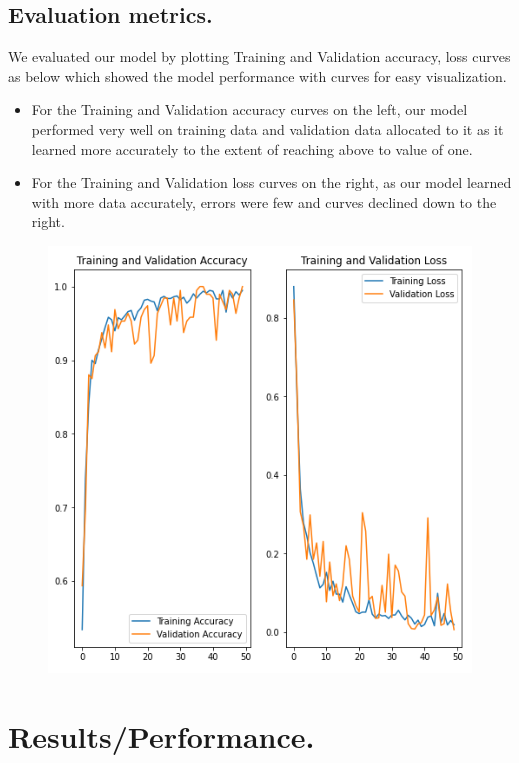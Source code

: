 \documentclass[11pt]{report}
\begin{document}
\subsection{Evaluation metrics.}
We evaluated our model by plotting Training and Validation accuracy, loss curves as below which showed the model performance with curves for easy visualization.\\
\begin{itemize}
	\item For the Training and Validation accuracy curves on the left, our model performed very well on training data and validation data allocated to it as it learned more accurately to the extent of reaching above to value of one.\\
	\item For the Training and Validation loss curves on the right, as our model learned with more data accurately, errors were few and curves declined down to the right.\\  
\end{itemize}
\begin{figure}[h]
	\centerline{\small 
		\includegraphics[height=0.35\textheight]  {bn}}
\end{figure}

\newpage
\section{Results/Performance.}
\end{document}
